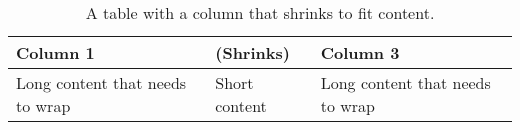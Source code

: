 \documentclass{article}
\begin{document}
\begin{table}
\centering
\begin{tabularx}{\textwidth}{|X|>{\centering\arraybackslash}X|X|}
\hline
Column 1 & 2 (Shrinks) & Column 3 \\
\hline
Long content that needs to wrap & Short content & Long content that needs to wrap \\
\hline
\end{tabularx}
\caption{A table with a column that shrinks to fit content.}
\label{tab:shrink}
\end{table}
\end{document}
